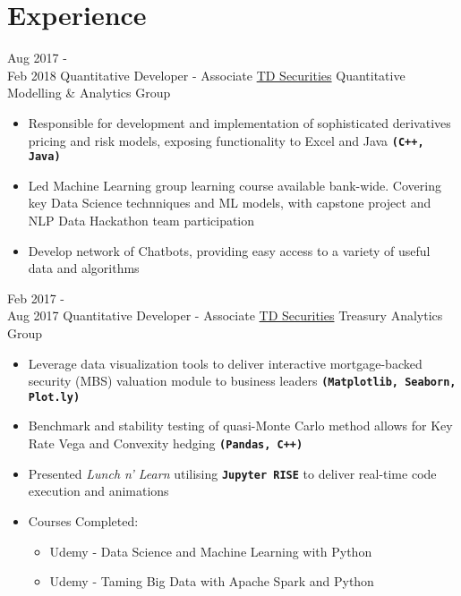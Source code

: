 \documentclass[letterpaper]{twentysecondcv} %
\begin{document}
\makeprofile %

\newcommand{\skill}[1]{\texttt{\textbf{#1}}}


\section{Experience}

\begin{twenty} %

	\twentyitem
    	{Aug 2017 - \\ Feb 2018}
        {Quantitative Developer - Associate}
        {\href{https://www.tdsecurities.com}{TD Securities}}
        {Quantitative Modelling \& Analytics Group}
        {
        {\begin{itemize}
        \item Responsible for development and implementation of sophisticated derivatives pricing and risk models, exposing functionality to Excel and Java \skill{(C++, Java)}
        \item Led Machine Learning group learning course available bank-wide. Covering key Data Science technniques and ML models, with capstone project and NLP Data Hackathon team participation
        \item Develop network of Chatbots, providing easy access to a variety of useful data and algorithms
    \end{itemize}}
        }

	\twentyitem
    	{Feb 2017 - \\ Aug 2017}
        {Quantitative Developer - Associate}
        {\href{https://www.tdsecurities.com}{TD Securities}}
        {Treasury Analytics Group}
        {
        {\begin{itemize}
		\item Leverage data visualization tools to deliver interactive mortgage-backed security (MBS) valuation module to business leaders \skill{(Matplotlib, Seaborn, Plot.ly)}
        \item Benchmark and stability testing of quasi-Monte Carlo method allows for Key Rate Vega and Convexity hedging   \skill{(Pandas, C++)}
        \item Presented \emph{Lunch n' Learn} utilising \skill{Jupyter RISE} to deliver real-time code execution and animations
        \item Courses Completed: 
        \begin{itemize}
        	\item Udemy - Data Science and Machine Learning with Python
        	\item Udemy - Taming Big Data with Apache Spark and Python
        \end{itemize}
    \end{itemize}}
        }
        
\end{twenty}
\vfill
\end{document}
